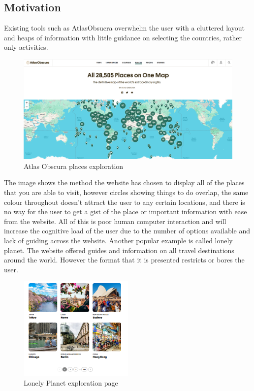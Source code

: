 \documentclass[]{project_final}
\begin{document}
\newpage
\subsection{Motivation}
Existing tools such as AtlasObsucra overwhelm the user with a cluttered layout
and heaps of information with little guidance on selecting the countries, rather only activities.

\begin{figure}[ht!]
    \centering
    \includegraphics[width=\textwidth]{atlasObscura.png}
    \caption{Atlas Obscura places exploration}
    \label{fig:1}
\end{figure}

The image shows the method the website has chosen to display all of the places that you
are able to visit, however circles showing things to do overlap, the same colour throughout
doesn’t attract the user to any certain locations, and there is no way for the user to get a gist
of the place or important information with ease from the website. All of this is poor human
computer interaction and will increase the cognitive load of the user due to the number of
options available and lack of guiding across the website. Another popular example is called
lonely planet. The website offered guides and information on all travel destinations around
the world. However the format that it is presented restricts or bores the user.

\begin{figure}[ht!]
    \centering
    \includegraphics[width=0.5\textwidth]{lonleyPlanet.png}
    \caption{Lonely Planet exploration page}
    \label{fig:1}
\end{figure}
\end{document}
